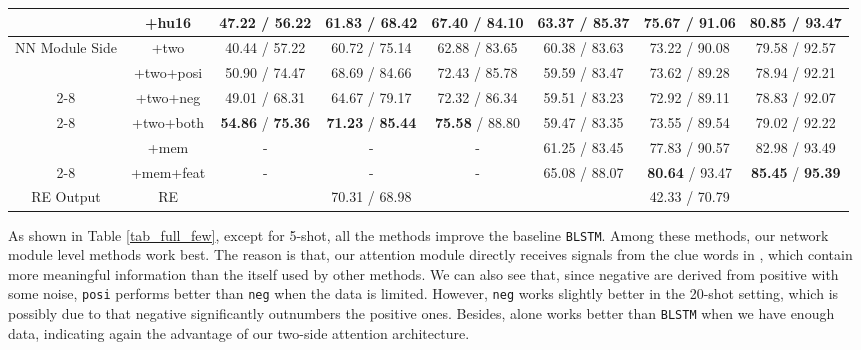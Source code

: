 \begin{table*}
{\begin{tabular}{|c|c|c|c|c|c|c|c|}
\rowcolor{Gray} \multirow{-2}{*}{Output Side}& +hu16 & 47.22 / 56.22 & 61.83 / 68.42 & 67.40 / 84.10
& 63.37 / 85.37 & 75.67 / 91.06 & 80.85 / 93.47  \\
\hline
\multirow{2}{*}{\vspace{-2.2em}NN Module Side} & +two & 40.44 / 57.22 & 60.72 / 75.14 & 62.88 / 83.65
& 60.38 / 83.63 & 73.22 / 90.08 & 79.58 / 92.57  \\
\cline{2-8}
& +two+posi & 50.90 / 74.47 & 68.69 / 84.66 & 72.43 / 85.78
& 59.59 / 83.47 & 73.62 / 89.28 & 78.94 / 92.21 \\
\cline{2-8}
& +two+neg & 49.01 / 68.31 & 64.67 / 79.17 & 72.32 / 86.34
& 59.51 / 83.23 & 72.92 / 89.11 & 78.83 / 92.07 \\
\cline{2-8}
& +two+both & \textbf{54.86} / \textbf{75.36} & \textbf{71.23} / \textbf{85.44} & \textbf{75.58} / 88.80
& 59.47 / 83.35 & 73.55 / 89.54 & 79.02 / 92.22 \\
\hline
\rowcolor{Gray} & +mem & - & - & - & 61.25 / 83.45 & 77.83 / 90.57 & 82.98 / 93.49 \\
\cline{2-8}
\rowcolor{Gray} \multirow{-2}{*}{Few-Shot Model}  & +mem+feat & - & - & - & 65.08 / 88.07 & \textbf{80.64} / 93.47 & \textbf{85.45} / \textbf{95.39} \\
\hline
\hline
RE Output & RE & \multicolumn{3}{|c|}{70.31 / 68.98} & \multicolumn{3}{|c|}{42.33 / 70.79} \\
\hline
\end{tabular}
}
\caption{Results on Full/Partial Few-Shot Learning Settings.}
\label{tab_full_few}
\end{table*}

As shown in Table \ref{tab_full_few}, except for 5-shot, all the methods improve the baseline \texttt{BLSTM}.
Among these methods, our network module level methods work best.
The reason is that, our attention module directly receives signals from the clue words in \REs, which contain more meaningful information than the \REtag itself used by other methods.
We can also see that, since negative \REs are derived from positive \REs with some noise, \texttt{posi} performs better than \texttt{neg} when the data is limited.
However, \texttt{neg} works slightly better in the 20-shot setting, which is possibly due to that negative \REs significantly outnumbers the positive ones.
Besides, \tatt alone works better than \texttt{BLSTM} when we have enough data, indicating again the advantage of our two-side attention architecture.

